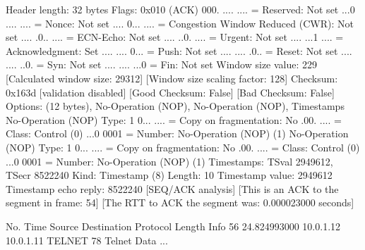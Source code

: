    Header length: 32 bytes
    Flags: 0x010 (ACK)
        000. .... .... = Reserved: Not set
        ...0 .... .... = Nonce: Not set
        .... 0... .... = Congestion Window Reduced (CWR): Not set
        .... .0.. .... = ECN-Echo: Not set
        .... ..0. .... = Urgent: Not set
        .... ...1 .... = Acknowledgment: Set
        .... .... 0... = Push: Not set
        .... .... .0.. = Reset: Not set
        .... .... ..0. = Syn: Not set
        .... .... ...0 = Fin: Not set
    Window size value: 229
    [Calculated window size: 29312]
    [Window size scaling factor: 128]
    Checksum: 0x163d [validation disabled]
        [Good Checksum: False]
        [Bad Checksum: False]
    Options: (12 bytes), No-Operation (NOP), No-Operation (NOP), Timestamps
        No-Operation (NOP)
            Type: 1
                0... .... = Copy on fragmentation: No
                .00. .... = Class: Control (0)
                ...0 0001 = Number: No-Operation (NOP) (1)
        No-Operation (NOP)
            Type: 1
                0... .... = Copy on fragmentation: No
                .00. .... = Class: Control (0)
                ...0 0001 = Number: No-Operation (NOP) (1)
        Timestamps: TSval 2949612, TSecr 8522240
            Kind: Timestamp (8)
            Length: 10
            Timestamp value: 2949612
            Timestamp echo reply: 8522240
    [SEQ/ACK analysis]
        [This is an ACK to the segment in frame: 54]
        [The RTT to ACK the segment was: 0.000023000 seconds]

No.     Time           Source                Destination           Protocol Length Info
     56 24.824993000   10.0.1.12             10.0.1.11             TELNET   78     Telnet Data ...

